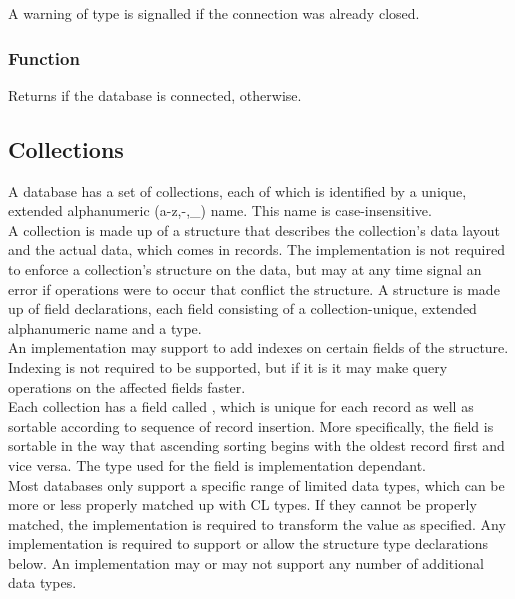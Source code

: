 \noindent A warning of type  is signalled if the connection was already closed.

\subsubsection{Function }
Returns  if the database is connected,  otherwise.

\subsection{Collections}
A database has a set of collections, each of which is identified by a unique, extended alphanumeric (a-z,-,\_) name. This name is case-insensitive. \\

A collection is made up of a structure that describes the collection's data layout and the actual data, which comes in records. The implementation is not required to enforce a collection's structure on the data, but may at any time signal an error if operations were to occur that conflict the structure. A structure is made up of field declarations, each field consisting of a collection-unique, extended alphanumeric name and a type.\\

An implementation may support to add indexes on certain fields of the structure. Indexing is not required to be supported, but if it is it may make query operations on the affected fields faster. \\

Each collection has a field called , which is unique for each record as well as sortable according to sequence of record insertion. More specifically, the  field is sortable in the way that ascending sorting begins with the oldest record first and vice versa. The type used for the field is implementation dependant. \\

Most databases only support a specific range of limited data types, which can be more or less properly matched up with CL types. If they cannot be properly matched, the implementation is required to transform the value as specified. Any implementation is required to support or allow the structure type declarations below. An implementation may or may not support any number of additional data types. 

